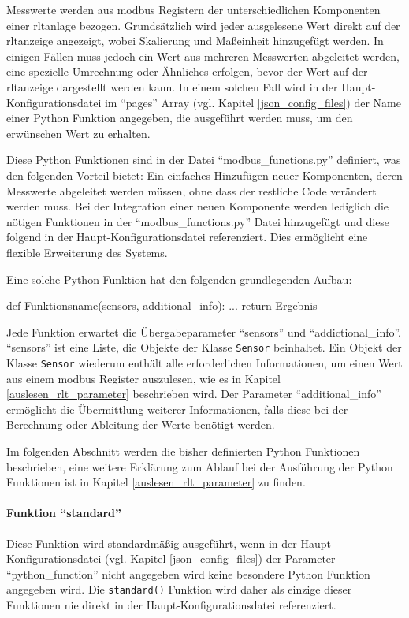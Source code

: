 \label{python_functions}
Messwerte werden aus \gls{modbus} Registern der unterschiedlichen Komponenten einer \acs{rltanlage} bezogen.  Grundsätzlich wird jeder ausgelesene Wert direkt auf der \acs{rltanzeige} angezeigt, wobei Skalierung und Maßeinheit hinzugefügt werden. In einigen Fällen muss jedoch ein Wert aus mehreren Messwerten abgeleitet werden, eine spezielle Umrechnung oder Ähnliches erfolgen, bevor der Wert auf der \acs{rltanzeige} dargestellt werden kann. In einem solchen Fall wird in der Haupt-Konfigurationsdatei im \enquote{pages} Array (vgl. Kapitel \ref{json_config_files}) der Name einer Python Funktion angegeben, die ausgeführt werden muss, um den erwünschen Wert zu erhalten. 

Diese Python Funktionen sind in der Datei \enquote{modbus\_functions.py} definiert, was den folgenden Vorteil bietet: Ein einfaches Hinzufügen neuer Komponenten, deren Messwerte abgeleitet werden müssen, ohne dass der restliche Code verändert werden muss. Bei der Integration einer neuen Komponente werden lediglich die nötigen Funktionen in der \enquote{modbus\_functions.py} Datei hinzugefügt und diese folgend in der Haupt-Konfigurationsdatei referenziert. Dies ermöglicht eine flexible  Erweiterung des Systems.

Eine solche Python Funktion hat den folgenden grundlegenden Aufbau:
\begin{pythoncode}
def Funktionsname(sensors, additional_info):
	...	
	return Ergebnis
\end{pythoncode}

Jede Funktion erwartet die Übergabeparameter \enquote{sensors} und \enquote{addictional\_info}. \enquote{sensors} ist eine Liste, die Objekte der Klasse \lstinline{Sensor} beinhaltet. Ein Objekt der Klasse \lstinline{Sensor} wiederum enthält alle erforderlichen Informationen, um einen Wert aus einem \gls{modbus} Register auszulesen, wie es in Kapitel \ref{auslesen_rlt_parameter} beschrieben wird. \newline 
Der Parameter \enquote{additional\_info} ermöglicht die Übermittlung weiterer Informationen, falls diese bei der Berechnung oder Ableitung der Werte benötigt werden.

Im folgenden Abschnitt werden die bisher definierten Python Funktionen beschrieben, eine weitere Erklärung zum Ablauf bei der Ausführung der Python Funktionen ist in Kapitel \ref{auslesen_rlt_parameter} zu finden.


\paragraph{Funktion \enquote{standard}}
Diese Funktion wird standardmäßig ausgeführt, wenn in der Haupt-Konfigurationsdatei (vgl. Kapitel \ref{json_config_files}) der Parameter \enquote{python\_function} nicht angegeben wird \bzw keine besondere Python Funktion angegeben wird. Die \lstinline{standard()} Funktion wird daher als einzige dieser Funktionen nie direkt in der Haupt-Konfigurationsdatei referenziert.

